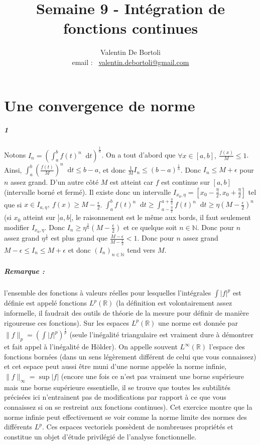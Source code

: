 \documentclass[10pt,a4paper]{article}
\title{Semaine 9 - Intégration de fonctions continues}
\author{Valentin De Bortoli \\ email : \ \href{mailto:valentin.debortoli@gmail.com}{valentin.debortoli@gmail.com}}
\date{}
\newcommand{\seq}[2]{\left( #1_{#2} \right)_{#2 \in \mathbb{N}} }
\newcommand{\intt}[4]{\int_{#1}^{#2} #3 \mathop{}\!\mathrm{d} #4}
\begin{document}
\maketitle
\section{Une convergence de norme}

\subparagraph{1}Notons $I_n = \left( \intt{a}{b}{f(t)^n}{t} \right)^{\frac{1}{n}}$.
On a tout d'abord que $\forall x \in [a,b], \ \frac{f(x)}{M} \le 1$. Ainsi,  $\intt{a}{b}{\left(\frac{f(t)}{M}\right)^n}{t} \le b-a$, et donc $\frac{1}{M} I_n \le (b-a)^{\frac{1}{n}}$. Donc $I_n \le M+\epsilon$ pour $n$ assez grand. D'un autre côté $M$ est atteint car $f$ est continue sur $[a,b]$ (intervalle borné et fermé). Il existe donc un intervalle $I_{x_0,\eta} = [x_0-\frac{\eta}{2},x_0+\frac{\eta}{2}]$ tel que si $x \in I_{a,\eta}, \ f(x) \ge M - \frac{\epsilon}{2}$. $\intt{a}{b}{f(t)^n}{t} \ge \intt{a-\frac{\eta}{2}}{a+\frac{\eta}{2}}{f(t)^n}{t} \ge \eta (M-\frac{\epsilon}{2})^n$ (si $x_0$ atteint sur $]a,b[$, le raisonnement est le même aux bords, il faut seulement modifier $I_{x_0,\eta}$. Donc $I_n \ge \eta^{\frac{1}{n}}(M-\frac{\epsilon}{2})$ et ce quelque soit $n \in \mathbb{N}$. Donc pour $n$ assez grand $\eta^{\frac{1}{n}}$ est plus grand que $\frac{M-\epsilon}{M-\frac{\epsilon}{2}}<1$. Donc pour $n$ assez grand $M-\epsilon \le I_n \le M+\epsilon$ et donc $\seq{I}{n}$ tend vers $M$.

\subparagraph{Remarque :} l'ensemble des fonctions à valeurs réelles pour lesquelles l'intégrales $\int \vert f \vert^{p} $ est définie est appelé fonctions $L^p(\mathbb{R})$ (la définition est volontairement assez informelle, il faudrait des outils de théorie de la mesure pour définir de manière rigoureuse ces fonctions). Sur les espaces $L^p(\mathbb{R})$ une norme est donnée par $\|f\|_p = \left(\int \vert f \vert^p \right)^{\frac{1}{p}}$ (seule l'inégalité triangulaire est vraiment dure à démontrer et fait appel à l'inégalité de Hölder). On appelle souvent $L^{\infty}(\mathbb{R})$ l'espace des fonctions bornées (dans un sens légèrement différent de celui que vous connaissez) et cet espace peut aussi être muni d'une norme appelée la norme infinie, $\| f \|_{\infty} = \sup \vert f \vert$ (encore une fois ce n'est pas vraiment une borne supérieure mais une borne supérieure essentielle, il se trouve que toutes les subtilités précisées ici n'entrainent pas de modifications par rapport à ce que vous connaissez si on se restreint aux fonctions continues). 
Cet exercice montre que la norme infinie peut effectivement se voir comme la norme limite des normes des différents $L^p$. Ces espaces vectoriels possèdent de nombreuses propriétés et constitue un objet d'étude privilégié de l'analyse fonctionnelle.
\end{document}

